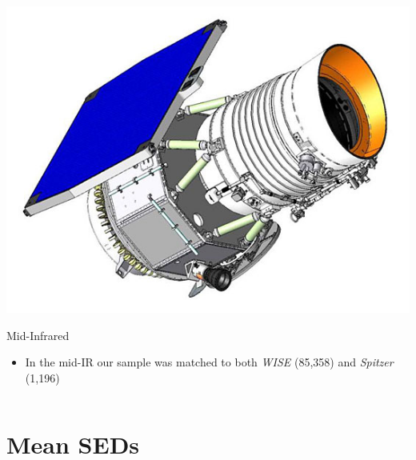 \documentclass[landscape,9pt]{beamer}
\begin{document}
\begin{frame}
\begin{columns}
\begin{column}{.4\textwidth}
{			\includegraphics[width=.5\textwidth]{../images/Talk/wise_satellite}
			\begin{block}{Mid-Infrared}
				\begin{itemize}
					\item In the mid-IR our sample was matched to both {\em WISE} (85,358) and {\em Spitzer} (1,196)
				\end{itemize}
			\end{block}}
	\end{column}
	\end{columns}
\end{frame}

\section{Mean SEDs}
\end{document}
